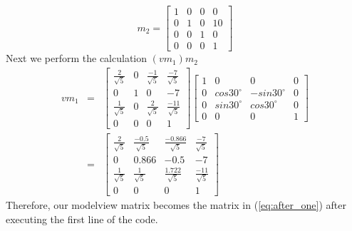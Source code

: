 \begin{itemize}
{        \begin{equation}
            m_2 = \begin{bmatrix}
                   1 & 0 & 0 & 0\\
                   0 & 1 & 0 & 10\\
                   0 & 0 & 1 & 0\\
                   0 & 0 & 0 & 1
                   \end{bmatrix}
            \label{eq:trans2}
        \end{equation}
        Next we perform the calculation $(vm_1)m_2$
        \begin{eqnarray}
            vm_1 &=& \begin{bmatrix}
                \frac{2}{\sqrt{5}} & 0 & \frac{-1}{\sqrt{5}} & \frac{-7}{\sqrt{5}} \\
                0 & 1 & 0 & -7 \\
                \frac{1}{\sqrt{5}} & 0 & \frac{2}{\sqrt{5}} & \frac{-11}{\sqrt{5}} \\
                0 & 0 & 0 & 1
            \end{bmatrix}
            \begin{bmatrix}
                   1 & 0 & 0 & 0\\
                   0 & cos30^\circ & -sin30^\circ & 0\\
                   0 & sin30^\circ & cos30^\circ & 0\\
                   0 & 0 & 0 & 1
                   \end{bmatrix}\\
                   &=& \begin{bmatrix}
                       \frac{2}{\sqrt{5}} & \frac{-0.5}{\sqrt{5}} & \frac{-0.866}{\sqrt{5}} & \frac{-7}{\sqrt{5}}\\
                       0 & 0.866 & -0.5 & -7\\
                       \label{eq:after_one}
                       \frac{1}{\sqrt{5}} & \frac{1}{\sqrt{5}} & \frac{1.722}{\sqrt{5}} & \frac{-11}{\sqrt{5}}\\
                       0 & 0 & 0 & 1
                       \end{bmatrix}
        \end{eqnarray}
        Therefore, our modelview matrix becomes the matrix in (\ref{eq:after_one}) after executing the first line
        of the code.

}
\end{itemize}
